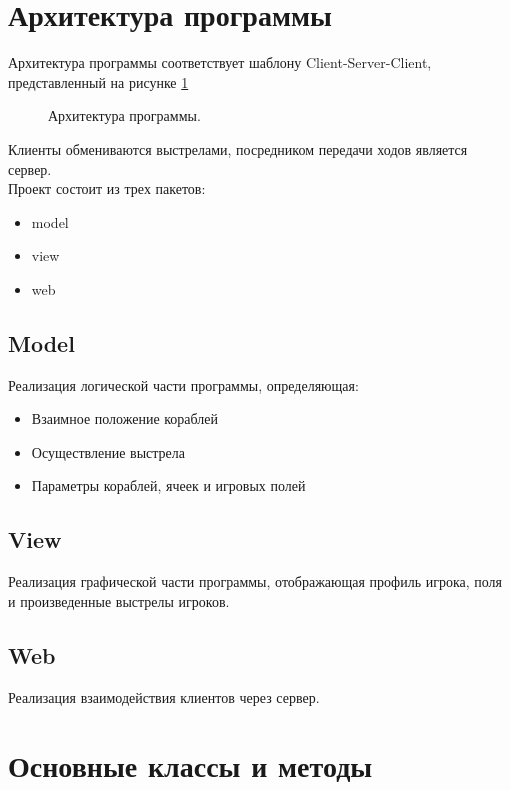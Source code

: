 \documentclass{article}
\begin{document}
		\section{Архитектура программы}
			Архитектура программы соответствует шаблону Client-Server-Client, представленный на рисунке \ref{clientserver}
			\begin{figure}[H]
				\caption{Архитектура программы.\label{clientserver}}
			\end{figure}
			Клиенты обмениваются выстрелами, посредником передачи ходов является сервер.\\
			Проект состоит из трех пакетов:
			\begin{itemize}
				\item{model}
				\item{view}
				\item{web}
			\end{itemize}
			\subsection{Model}
				Реализация логической части программы, определяющая:
				\begin{itemize}
					\item {Взаимное положение кораблей}
					\item {Осуществление выстрела}
					\item {Параметры кораблей, ячеек и игровых полей}
				\end{itemize}
			\subsection{View}
				Реализация графической части программы, отображающая профиль игрока, поля и произведенные выстрелы игроков.
			\subsection{Web}
				Реализация взаимодействия клиентов через сервер.
		\section{Основные классы и методы}
\end{document}
